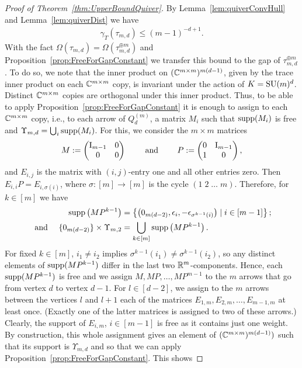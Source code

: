 \begin{proof}[Proof of Theorem~\ref{thm:UpperBoundQuiver}]
	By Lemma~\ref{lem:quiverConvHull} and Lemma~\ref{lem:quiverDist} we have 
	\begin{align*}
		\gamma_{T}(\tau_{m,d}) \leq (m-1)^{-d+1}.
	\end{align*}
	With the fact $\Omega(\tau_{m,d}) = \Omega(\tau_{m,d}^{\oplus m})$ and Proposition~\ref{prop:FreeForGapConstant} we transfer this bound to the gap of $\tau_{m,d}^{\oplus m}$. To do so, we note that the inner product on $(\mathbb C^{m \times m})^{m(d-1)}$, given by the trace inner product on each $\mathbb C^{m \times m}$ copy, is invariant under the action of $K = \operatorname{SU}(m)^d$. Distinct $\mathbb C^{m \times m}$ copies are orthogonal under this inner product. Thus, to be able to apply Proposition~\ref{prop:FreeForGapConstant} it is enough to assign to each $\mathbb C^{m \times m}$ copy, i.e., to each arrow of $Q_d^{(m)}$, a matrix $M_i$ such that $\operatorname{supp}(M_i)$ is free and $\Upsilon_{m,d} = \bigcup_i \operatorname{supp}(M_i)$.
	For this, we consider the $m \times m$ matrices
	\begin{align*}
		M := \begin{pmatrix} \operatorname{I}_{m-1} & 0 \\ 0 & 0 \end{pmatrix} \qquad \text{ and } \qquad
		P := \begin{pmatrix} 0 & \operatorname{I}_{m-1} \\ 1 & 0 \end{pmatrix},
	\end{align*}
	and $E_{i,j}$ is the matrix with $(i,j)$-entry one and all other entries zero. Then $E_{i,i}P = E_{i,\sigma(i)}$, where $\sigma \colon [m] \to [m]$ is the cycle $(1 \; 2\; \ldots \; m)$. Therefore, for $k \in [m]$ we have
	\begin{align*}
		\operatorname{supp} \left(MP^{k-1} \right) &= \left\lbrace \big( 0_{m(d-2)}, \epsilon_i, -\epsilon_{\sigma^{k-1}(i)} \big)  \mid i \in [m-1] \right\rbrace ; \\
		\text{ and } \quad  \lbrace 0_{m(d-2)} \rbrace \times \Upsilon_{m,2} &= \bigcup_{k \in [m]} \operatorname{supp} \left(MP^{k-1} \right).
	\end{align*}
	For fixed $k \in [m]$, $i_1 \neq i_2$ implies $\sigma^{k-1}(i_1) \neq \sigma^{k-1}(i_2)$, so any distinct elements of $\operatorname{supp}(MP^{k-1})$ differ in the last two $\mathbb R^m$-components. Hence, each $\operatorname{supp}(MP^{k-1})$ is free and we assign $M, MP, \ldots, MP^{m-1}$ to the $m$ arrows that go from vertex $d$ to vertex $d-1$. For $l \in [d-2]$, we assign to the $m$ arrows between the vertices $l$ and $l+1$ each of the matrices $E_{1,m}, E_{2,m}, \ldots, E_{m-1,m}$ at least once. (Exactly one of the latter matrices is assigned to two of these arrows.) Clearly, the support of $E_{i,m}$, $i \in [m-1]$ is free as it contains just one weight. By construction, this whole assignment gives an element of $(\mathbb C^{m \times m})^{m(d-1)})$ such that its support is $\Upsilon_{m,d}$ and so that we can apply Proposition~\ref{prop:FreeForGapConstant}. This shows

\end{proof}
